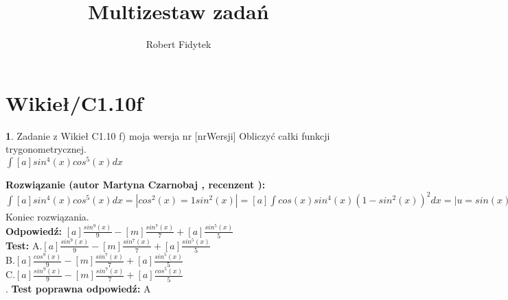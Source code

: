 \documentclass[12pt, a4paper]{article}
\title{Multizestaw zadań}
\author{Robert Fidytek}
\date{}
\theoremstyle{definition} %
\newtheorem{zad}{}
\newcommand{\kategoria}[1]{\section{#1}} %
\newcommand{\zadStart}[1]{\begin{zad}#1\newline} %
\newcommand{\zadStop}{\end{zad}}   %
\newcommand{\rozwStart}[2]{\noindent \textbf{Rozwiązanie (autor #1 , recenzent #2): }\newline} %
\newcommand{\rozwStop}{\newline}                                            %
\newcommand{\odpStart}{\noindent \textbf{Odpowiedź:}\newline}    %
\newcommand{\odpStop}{\newline}                                             %
\newcommand{\testStart}{\noindent \textbf{Test:}\newline} %
\newcommand{\testStop}{\newline} %
\newcommand{\kluczStart}{\noindent \textbf{Test poprawna odpowiedź:}\newline} %
\newcommand{\kluczStop}{\newline} %
\begin{document}
\maketitle


\kategoria{Wikieł/C1.10f}
\zadStart{Zadanie z Wikieł C1.10 f) moja wersja nr [nrWersji]}
Obliczyć całki funkcji trygonometrycznej.\\
$\int [a] sin^{4}(x)cos^{5}(x) dx$\\
\zadStop
\rozwStart{Martyna Czarnobaj}{}
	$\int [a] sin^{4}(x)cos^{5}(x) dx = |cos^{2}(x) = 1  sin^{2}(x)| = [a] \int cos(x)sin^{4}(x) (1-sin^{2}(x))^{2} dx = |u=sin(x), du=cos(x) dx| = [a] \int u^{4}(1-u^{2})^{2} du = [a] \int u^{8} - 2u^{6} + u^{4} du = [a] (\int u^{8} du - 2 \int u^{6} du + \int u^{4} du) = [a] (\frac{u^{9}}{9} - 2\frac{u^{7}}{7} + \frac{u^{5}}{5}) = [a]\frac{u^{9}}{9} - [m]\frac{u^{7}}{7} + [a]\frac{u^{5}}{5} = [a]\frac{sin^{9}(x)}{9} - [m]\frac{sin^{7}(x)}{7} + [a]\frac{sin^{5}(x)}{5}$\\ 


Koniec rozwiązania.\\
\rozwStop
\odpStart
$ [a]\frac{sin^{9}(x)}{9} - [m]\frac{sin^{7}(x)}{7} + [a]\frac{sin^{5}(x)}{5}$\\
\odpStop
\testStart
A.$ [a]\frac{sin^{9}(x)}{9} - [m]\frac{sin^{7}(x)}{7} + [a]\frac{sin^{5}(x)}{5}$\\
B.$ [a]\frac{cos^{9}(x)}{9} - [m]\frac{sin^{7}(x)}{7} + [a]\frac{sin^{5}(x)}{5}$\\
C.$ [a]\frac{sin^{9}(x)}{9} - [m]\frac{sin^{7}(x)}{7} + [a]\frac{cos^{5}(x)}{5}$\\
.
\testStop
\kluczStart
A
\kluczStop
\end{document}
